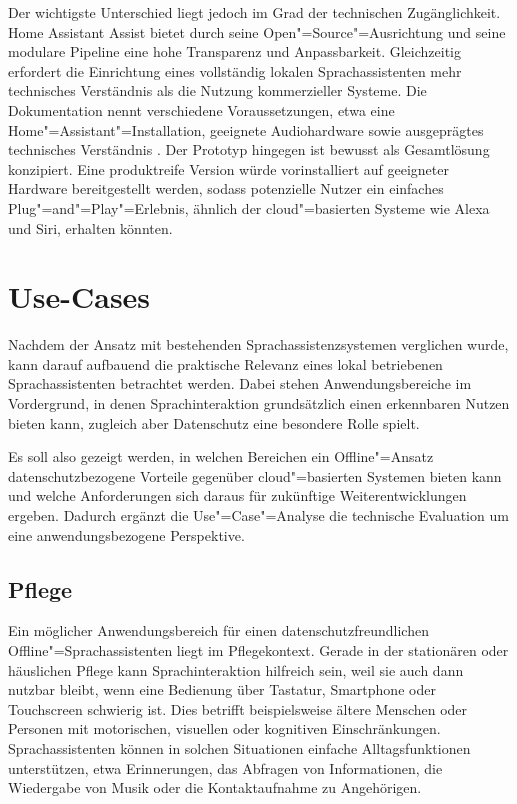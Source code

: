 Der wichtigste Unterschied liegt jedoch im Grad der technischen Zugänglichkeit. Home Assistant Assist bietet durch seine Open"=Source"=Ausrichtung und seine modulare Pipeline eine hohe Transparenz und Anpassbarkeit. Gleichzeitig erfordert die Einrichtung eines vollständig lokalen Sprachassistenten mehr technisches Verständnis als die Nutzung kommerzieller Systeme. Die Dokumentation nennt verschiedene Voraussetzungen, etwa eine Home"=Assistant"=Installation, geeignete Audiohardware sowie ausgeprägtes technisches Verständnis \autocite{Assist-Documentation}. Der Prototyp hingegen ist bewusst als Gesamtlösung konzipiert. Eine produktreife Version würde vorinstalliert auf geeigneter Hardware bereitgestellt werden, sodass potenzielle Nutzer ein einfaches Plug"=and"=Play"=Erlebnis, ähnlich der cloud"=basierten Systeme wie Alexa und Siri, erhalten könnten.


\section{Use-Cases}
\label{sec:Use_Cases}
Nachdem der Ansatz mit bestehenden Sprachassistenzsystemen verglichen wurde, kann darauf aufbauend die praktische Relevanz eines lokal betriebenen Sprachassistenten betrachtet werden. Dabei stehen Anwendungsbereiche im Vordergrund, in denen Sprachinteraktion grundsätzlich einen erkennbaren Nutzen bieten kann, zugleich aber Datenschutz eine besondere Rolle spielt.

Es soll also gezeigt werden, in welchen Bereichen ein Offline"=Ansatz datenschutzbezogene Vorteile gegenüber cloud"=basierten Systemen bieten kann und welche Anforderungen sich daraus für zukünftige Weiterentwicklungen ergeben. Dadurch ergänzt die Use"=Case"=Analyse die technische Evaluation um eine anwendungsbezogene Perspektive.


\subsection{Pflege}
\label{subsec:Use_Case_Pflege}
Ein möglicher Anwendungsbereich für einen datenschutzfreundlichen Offline"=Sprachassistenten liegt im Pflegekontext. Gerade in der stationären oder häuslichen Pflege kann Sprachinteraktion hilfreich sein, weil sie auch dann nutzbar bleibt, wenn eine Bedienung über Tastatur, Smartphone oder Touchscreen schwierig ist. Dies betrifft beispielsweise ältere Menschen oder Personen mit motorischen, visuellen oder kognitiven Einschränkungen. Sprachassistenten können in solchen Situationen einfache Alltagsfunktionen unterstützen, etwa Erinnerungen, das Abfragen von Informationen, die Wiedergabe von Musik oder die Kontaktaufnahme zu Angehörigen.

